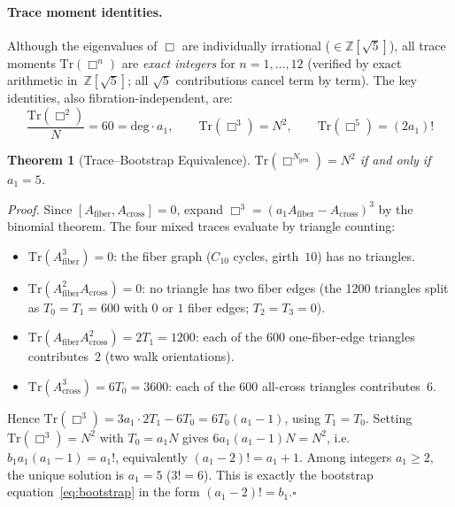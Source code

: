 \documentclass[12pt,a4paper]{article}
\newtheorem{theorem}{Theorem}
\theoremstyle{definition}
\begin{document}
\paragraph{Trace moment identities.}
Although the eigenvalues of $\Box$ are individually irrational ($\in \mathbb{Z}[\sqrt{5}]$), all trace moments $\mathrm{Tr}(\Box^n)$ are \emph{exact integers} for $n = 1, \ldots, 12$ (verified by exact arithmetic in~$\mathbb{Z}[\sqrt{5}]$; all $\sqrt{5}$ contributions cancel term by term).  The key identities, also fibration-independent, are:
\begin{equation}
\frac{\mathrm{Tr}(\Box^2)}{N} = 60 = \mathrm{deg}\cdot a_1, \qquad
\mathrm{Tr}(\Box^3) = N^2, \qquad
\mathrm{Tr}(\Box^5) = (2a_1)!
\label{eq:box_traces}
\end{equation}

\begin{theorem}[Trace--Bootstrap Equivalence]\label{thm:trace_bootstrap}
$\mathrm{Tr}(\Box^{N_{\mathrm{gen}}}) = N^2$ if and only if $a_1 = 5$.
\end{theorem}

\noindent\textit{Proof.}  Since $[A_{\mathrm{fiber}}, A_{\mathrm{cross}}] = 0$, expand $\Box^3 = (a_1 A_{\mathrm{fiber}} - A_{\mathrm{cross}})^3$ by the binomial theorem.  The four mixed traces evaluate by triangle counting:
\begin{itemize}
\item $\mathrm{Tr}(A_{\mathrm{fiber}}^3) = 0$: the fiber graph ($C_{10}$ cycles, girth~$10$) has no triangles.
\item $\mathrm{Tr}(A_{\mathrm{fiber}}^2 A_{\mathrm{cross}}) = 0$: no triangle has two fiber edges (the 1200 triangles split as $T_0 = T_1 = 600$ with $0$ or $1$ fiber edges; $T_2 = T_3 = 0$).
\item $\mathrm{Tr}(A_{\mathrm{fiber}} A_{\mathrm{cross}}^2) = 2T_1 = 1200$: each of the $600$ one-fiber-edge triangles contributes~$2$ (two walk orientations).
\item $\mathrm{Tr}(A_{\mathrm{cross}}^3) = 6T_0 = 3600$: each of the $600$ all-cross triangles contributes~$6$.
\end{itemize}
Hence $\mathrm{Tr}(\Box^3) = 3a_1 \cdot 2T_1 - 6T_0 = 6T_0(a_1 - 1)$, using $T_1 = T_0$.  Setting $\mathrm{Tr}(\Box^3) = N^2$ with $T_0 = a_1 N$ gives $6a_1(a_1-1)N = N^2$, i.e.\ $b_1 a_1(a_1-1) = a_1!$, equivalently $(a_1-2)! = a_1 + 1$.  Among integers $a_1 \ge 2$, the unique solution is $a_1 = 5$ ($3! = 6$). This is exactly the bootstrap equation~\eqref{eq:bootstrap} in the form $(a_1-2)! = b_1$.\hfill$\square$
\end{document}
